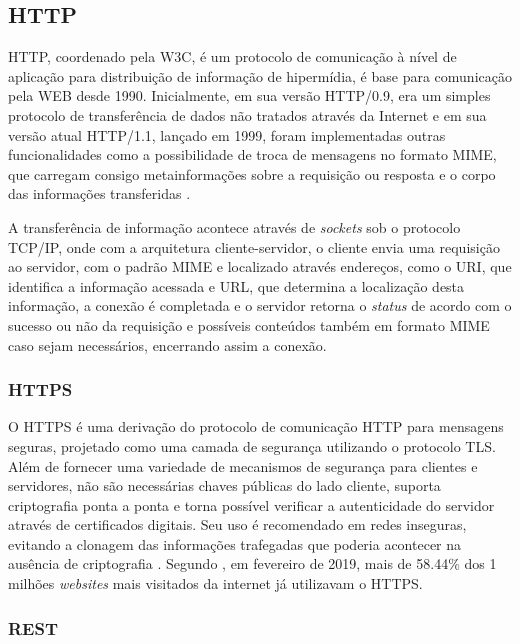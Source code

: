     \subsection{HTTP}
    \label{sec:http}
    \gls{HTTP}, coordenado pela \gls{W3C}, é um protocolo de comunicação à nível de aplicação para distribuição de informação de hipermídia, é base para comunicação pela \gls{WEB} desde 1990. Inicialmente, em sua versão HTTP/0.9, era um simples protocolo de transferência de dados não tratados através da Internet e em sua versão atual HTTP/1.1, lançado em 1999, foram implementadas outras funcionalidades como a possibilidade de troca de mensagens no formato \gls{MIME}, que carregam consigo metainformações sobre a requisição ou resposta e o corpo das informações transferidas \cite{HTTP}.
    
    A transferência de informação acontece através de \textit{sockets} sob o protocolo \gls{TCP/IP}, onde com a arquitetura cliente-servidor, o cliente envia uma requisição ao servidor, com o padrão \gls{MIME} e  localizado através endereços, como o \gls{URI}, que identifica a informação acessada e \gls{URL}, que determina a localização desta informação, a conexão é completada e o servidor retorna o \textit{status} de acordo com o sucesso ou não da requisição e possíveis conteúdos também em formato \gls{MIME} caso sejam necessários, encerrando assim a conexão.
    
        \subsubsection{HTTPS}
        \label{sec:https}
        O \gls{HTTPS} é uma derivação do protocolo de comunicação \gls{HTTP} para mensagens seguras, projetado como uma camada de segurança utilizando o protocolo \gls{TLS}. Além de fornecer uma variedade de mecanismos de segurança para clientes e servidores, não são necessárias chaves públicas do lado cliente, suporta criptografia ponta a ponta e torna possível verificar a autenticidade do servidor através de certificados digitais. Seu uso é recomendado em redes inseguras, evitando a clonagem das informações trafegadas que poderia acontecer na ausência de criptografia \cite{HTTPS}. Segundo \cite{usoHTTPS}, em fevereiro de 2019, mais de 58.44\% dos 1 milhões \textit{websites} mais visitados da internet já utilizavam o \gls{HTTPS}.
        
        \subsubsection{REST}
        \label{sec:rest}

